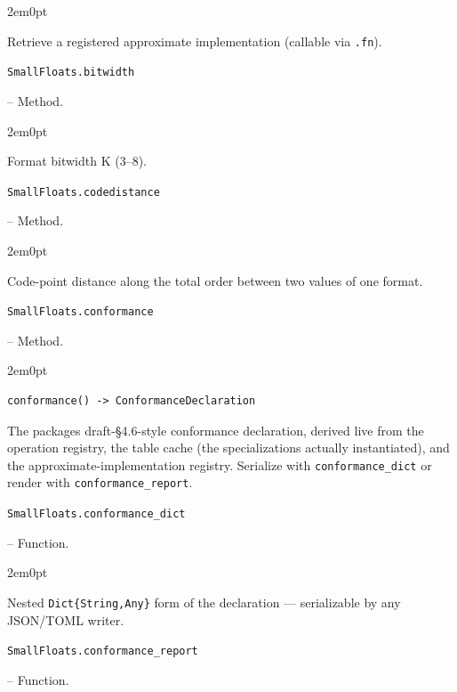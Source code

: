 \begin{adjustwidth}{2em}{0pt}

Retrieve a registered approximate implementation (callable via \texttt{.fn}).



\end{adjustwidth}
\hypertarget{10167532859324986487}{\texttt{SmallFloats.bitwidth}}  -- {Method.}

\begin{adjustwidth}{2em}{0pt}

Format bitwidth K (3–8).



\end{adjustwidth}
\hypertarget{12693397031431816949}{\texttt{SmallFloats.codedistance}}  -- {Method.}

\begin{adjustwidth}{2em}{0pt}

Code-point distance along the total order between two values of one format.



\end{adjustwidth}
\hypertarget{3926398212792611207}{\texttt{SmallFloats.conformance}}  -- {Method.}

\begin{adjustwidth}{2em}{0pt}


\begin{verbatim}
conformance() -> ConformanceDeclaration
\end{verbatim}

The package{\textquotesingle}s draft-§4.6-style conformance declaration, derived live from the operation registry, the table cache (the specializations actually instantiated), and the approximate-implementation registry. Serialize with \texttt{conformance\_dict} or render with \texttt{conformance\_report}.



\end{adjustwidth}
\hypertarget{590311556486812861}{\texttt{SmallFloats.conformance\_dict}}  -- {Function.}

\begin{adjustwidth}{2em}{0pt}

Nested \texttt{Dict\{String,Any\}} form of the declaration — serializable by any JSON/TOML writer.



\end{adjustwidth}
\hypertarget{18172896664359196039}{\texttt{SmallFloats.conformance\_report}}  -- {Function.}

